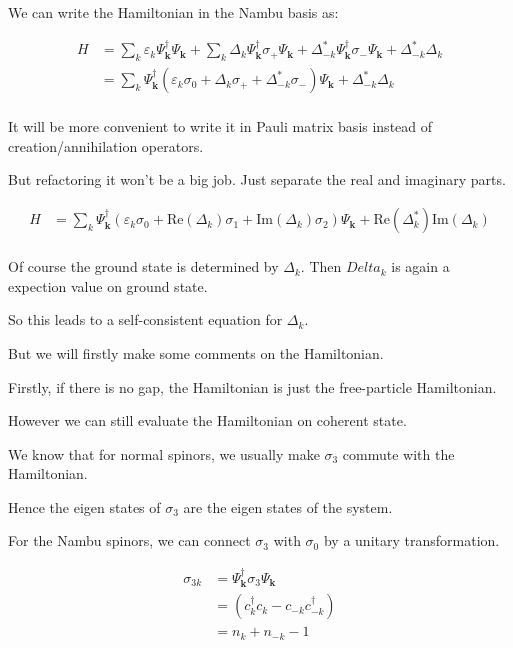 \documentclass[14pt, a4paper]{extarticle}
\begin{document}
We can write the Hamiltonian in the Nambu basis as:

\begin{align}
    H & = \sum_{k} \varepsilon_{k} \Psi_{\mathbf{k}}^{\dagger} \Psi_{\mathbf{k}} + \sum_{k} \Delta_{k} \Psi_{\mathbf{k}}^{\dagger} \sigma_+ \Psi_{\mathbf{k}} + \Delta^*_{-k} \Psi_{\mathbf{k}}^{\dagger} \sigma_- \Psi_{\mathbf{k}} + \Delta^*_{-k} \Delta_{k} \\
      & = \sum_{k} \Psi_{\mathbf{k}}^{\dagger} (\varepsilon_{k} \sigma_0 + \Delta_{k} \sigma_+ + \Delta^*_{-k} \sigma_- ) \Psi_{\mathbf{k}} + \Delta^*_{-k} \Delta_{k} \\
\end{align}

It will be more convenient to write it in Pauli matrix basis instead of creation/annihilation operators.

But refactoring it won't be a big job. Just separate the real and imaginary parts.

\begin{align}
    H & = \sum_{k} \Psi_{\mathbf{k}}^{\dagger} (\varepsilon_{k} \sigma_0 + \mathrm{Re}(\Delta_{k}) \sigma_1 + \mathrm{Im}(\Delta_{k}) \sigma_2 ) \Psi_{\mathbf{k}} + \mathrm{Re}(\Delta^*_{k}) \mathrm{Im}(\Delta_{k}) \\
\end{align}

Of course the ground state is determined by $\Delta_{k}$. Then $Delta_{k}$ is again a expection value on ground state.

So this leads to a self-consistent equation for $\Delta_{k}$.

But we will firstly make some comments on the Hamiltonian.

Firstly, if there is no gap, the Hamiltonian is just the free-particle Hamiltonian.

However we can still evaluate the Hamiltonian on coherent state.

We know that for normal spinors, we usually make $\sigma_3$ commute with the Hamiltonian.

Hence the eigen states of $\sigma_3$ are the eigen states of the system.

For the Nambu spinors, we can connect $\sigma_3$ with $\sigma_0$ by a unitary transformation.

\begin{align}
    \sigma_{3k} & = \Psi_{\mathbf{k}}^{\dagger} \sigma_3 \Psi_{\mathbf{k}} \\
     & = (c_{k}^\dagger c_{k} - c_{-k} c_{-k}^\dagger) \\
     & = n_k + n_{-k} - 1 \\
\end{align}
\end{document}
